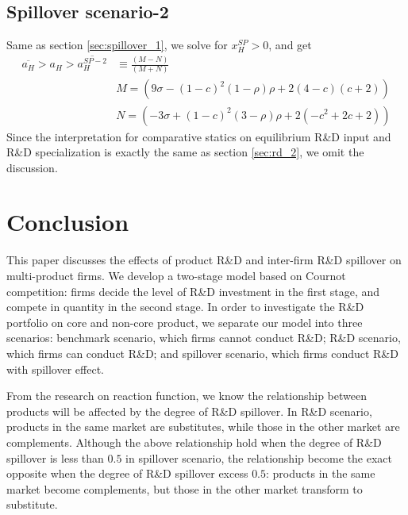\documentclass[12pt]{article}
\begin{document}
\subsection{Spillover scenario-2}
\label{sec:spillover-2}
Same as section \ref{sec:spillover_1}, we solve for $x_H^{SP} > 0$, and get
\begin{equation}
  \begin{aligned}
  \overline{a_H} > a_H > \overline{a_H^{SP-2}} & \equiv \frac{(M - N)}{(M + N)} \\
  & M = (9 \sigma - (1 - c)^2  (1 - \rho) \rho + 2 (4 - c)  (c + 2))\\
  & N = (- 3 \sigma + (1 - c)^2  (3 - \rho) \rho + 2 (- c^2 + 2 c + 2)) 
    \end{aligned}
  \label{eq:xHSP_pos}
  \tag{C7}
\end{equation}
Since the interpretation for comparative statics on equilibrium R\&D input and R\&D specialization is exactly the same as section \ref{sec:rd_2}, we omit the discussion.

\section{Conclusion} \label{sec:conclusion}

This paper discusses the effects of product R\&D and inter-firm R\&D spillover on multi-product firms.
We develop a two-stage model based on Cournot competition: firms decide the level of R\&D investment in the first stage, and compete in quantity in the second stage.
In order to investigate the R\&D portfolio on core and non-core product, we separate our model into three scenarios: benchmark scenario, which firms cannot conduct R\&D; R\&D scenario, which firms can conduct R\&D; and spillover scenario, which firms conduct R\&D with spillover effect.

From the research on reaction function, we know the relationship between products will be affected by the degree of R\&D spillover.
In R\&D scenario, products in the same market are substitutes, while those in the other market are complements.
Although the above relationship hold when the degree of R\&D spillover is less than $0.5$ in spillover scenario, the relationship become the exact opposite when the degree of R\&D spillover excess $0.5$: products in the same market become complements, but those in the other market transform to substitute.
\end{document}
